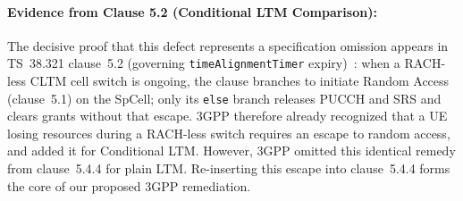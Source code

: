\paragraph{Evidence from Clause 5.2 (Conditional LTM Comparison):}
The decisive proof that this defect represents a specification omission appears in TS~38.321 clause~5.2
(governing \texttt{timeAlignmentTimer} expiry)~\cite{3gpp38321}: when a RACH-less CLTM cell switch is
ongoing, the clause branches to initiate Random Access (clause~5.1) on the SpCell; only its \texttt{else}
branch releases PUCCH and SRS and clears grants without that escape. 3GPP therefore already recognized
that a UE losing resources during a RACH-less switch requires an escape to random access, and added it
for Conditional LTM. However, 3GPP omitted this identical remedy from clause~5.4.4 for plain LTM.
Re-inserting this escape into clause~5.4.4 forms the core of our proposed 3GPP remediation.
